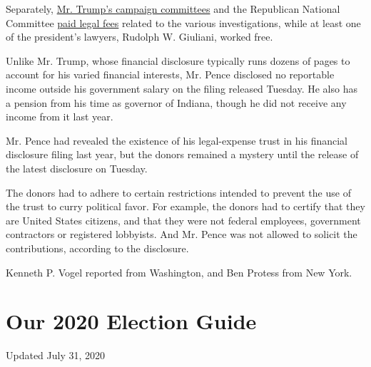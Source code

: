 Separately,
\href{https://www.nytimes.com/2017/07/15/us/politics/trump-campaign-legal-fees.html}{Mr.
Trump's campaign committees} and the Republican National Committee
\href{https://www.nytimes.com/2017/10/15/us/politics/trump-campaign-legal-fees-russia.html}{paid
legal fees} related to the various investigations, while at least one of
the president's lawyers, Rudolph W. Giuliani, worked free.

Unlike Mr. Trump, whose financial disclosure typically runs dozens of
pages to account for his varied financial interests, Mr. Pence disclosed
no reportable income outside his government salary on the filing
released Tuesday. He also has a pension from his time as governor of
Indiana, though he did not receive any income from it last year.

Mr. Pence had revealed the existence of his legal-expense trust in his
financial disclosure filing last year, but the donors remained a mystery
until the release of the latest disclosure on Tuesday.

The donors had to adhere to certain restrictions intended to prevent the
use of the trust to curry political favor. For example, the donors had
to certify that they are United States citizens, and that they were not
federal employees, government contractors or registered lobbyists. And
Mr. Pence was not allowed to solicit the contributions, according to the
disclosure.

Kenneth P. Vogel reported from Washington, and Ben Protess from New
York.

\hypertarget{our-2020-election-guide}{%
\section{Our 2020 Election Guide}\label{our-2020-election-guide}}

Updated July 31, 2020

